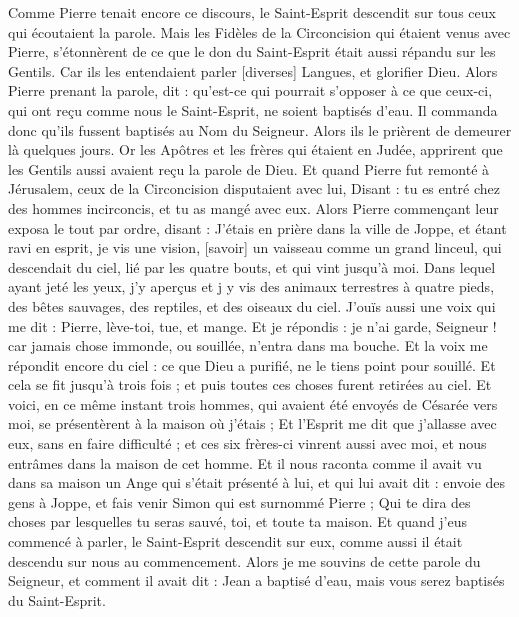 \begin{multicols}{2}
Comme Pierre tenait encore ce discours, le Saint-Esprit descendit sur tous ceux qui écoutaient la parole.
Mais les Fidèles de la Circoncision qui étaient venus avec Pierre, s'étonnèrent de ce que le don du Saint-Esprit était aussi répandu sur les Gentils.
Car ils les entendaient parler [diverses] Langues, et glorifier Dieu.
Alors Pierre prenant la parole, dit : qu'est-ce qui pourrait s'opposer à ce que ceux-ci, qui ont reçu comme nous le Saint-Esprit, ne soient baptisés d'eau.
Il commanda donc qu'ils fussent baptisés au Nom du Seigneur. Alors ils le prièrent de demeurer là quelques jours.
\VerseOne{}Or les Apôtres et les frères qui étaient en Judée, apprirent que les Gentils aussi avaient reçu la parole de Dieu.
Et quand Pierre fut remonté à Jérusalem, ceux de la Circoncision disputaient avec lui,
Disant : tu es entré chez des hommes incirconcis, et tu as mangé avec eux.
Alors Pierre commençant leur exposa le tout par ordre, disant :
J'étais en prière dans la ville de Joppe, et étant ravi en esprit, je vis une vision, [savoir] un vaisseau comme un grand linceul, qui descendait du ciel, lié par les quatre bouts, et qui vint jusqu'à moi.
Dans lequel ayant jeté les yeux, j'y aperçus et j y vis des animaux terrestres à quatre pieds, des bêtes sauvages, des reptiles, et des oiseaux du ciel.
J'ouïs aussi une voix qui me dit : Pierre, lève-toi, tue, et mange.
Et je répondis : je n'ai garde, Seigneur ! car jamais chose immonde, ou souillée, n'entra dans ma bouche.
Et la voix me répondit encore du ciel : ce que Dieu a purifié, ne le tiens point pour souillé.
Et cela se fit jusqu'à trois fois ; et puis toutes ces choses furent retirées au ciel.
Et voici, en ce même instant trois hommes, qui avaient été envoyés de Césarée vers moi, se présentèrent à la maison où j'étais ;
Et l'Esprit me dit que j'allasse avec eux, sans en faire difficulté ; et ces six frères-ci vinrent aussi avec moi, et nous entrâmes dans la maison de cet homme.
Et il nous raconta comme il avait vu dans sa maison un Ange qui s'était présenté à lui, et qui lui avait dit : envoie des gens à Joppe, et fais venir Simon qui est surnommé Pierre ;
Qui te dira des choses par lesquelles tu seras sauvé, toi, et toute ta maison.
Et quand j'eus commencé à parler, le Saint-Esprit descendit sur eux, comme aussi il était descendu sur nous au commencement.
Alors je me souvins de cette parole du Seigneur, et comment il avait dit : Jean a baptisé d'eau, mais vous serez baptisés du Saint-Esprit.

\end{multicols}
